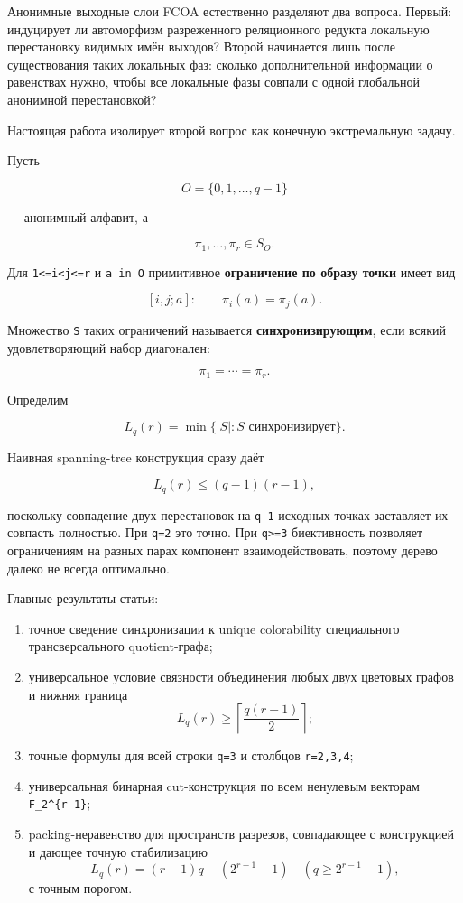 Анонимные выходные слои FCOA естественно разделяют два вопроса. Первый:
индуцирует ли автоморфизм разреженного реляционного редукта локальную
перестановку видимых имён выходов? Второй начинается лишь после
существования таких локальных фаз: сколько дополнительной информации о
равенствах нужно, чтобы все локальные фазы совпали с одной глобальной
анонимной перестановкой?

Настоящая работа изолирует второй вопрос как конечную экстремальную
задачу.

Пусть

\[
O=\{0,1,\ldots,q-1\}
\]

--- анонимный алфавит, а

\[
\pi_1,\ldots,\pi_r\in S_O.
\]

Для \texttt{1\textless{}=i\textless{}j\textless{}=r} и \texttt{a\ in\ O}
примитивное \textbf{ограничение по образу точки} имеет вид

\[
[i,j;a]:\qquad \pi_i(a)=\pi_j(a).
\tag{1}
\]

Множество \texttt{S} таких ограничений называется
\textbf{синхронизирующим}, если всякий удовлетворяющий набор диагонален:

\[
\pi_1=\cdots=\pi_r.
\tag{2}
\]

Определим

\[
\boxed{
L_q(r)=\min\{|S|:S\text{ синхронизирует}\}.
}
\tag{3}
\]

Наивная spanning-tree конструкция сразу даёт

\[
L_q(r)\le(q-1)(r-1),
\tag{4}
\]

поскольку совпадение двух перестановок на \texttt{q-1} исходных точках
заставляет их совпасть полностью. При \texttt{q=2} это точно. При
\texttt{q\textgreater{}=3} биективность позволяет ограничениям на разных
парах компонент взаимодействовать, поэтому дерево далеко не всегда
оптимально.

Главные результаты статьи:

\begin{enumerate}
\def\labelenumi{\arabic{enumi}.}
\tightlist
\item
  точное сведение синхронизации к unique colorability специального
  трансверсального quotient-графа;
\item
  универсальное условие связности объединения любых двух цветовых графов
  и нижняя граница \[
  L_q(r)\ge\left\lceil\frac{q(r-1)}2\right\rceil;
  \tag{5}
  \]
\item
  точные формулы для всей строки \texttt{q=3} и столбцов
  \texttt{r=2,3,4};
\item
  универсальная бинарная cut-конструкция по всем ненулевым векторам
  \texttt{F\_2\^{}\{r-1\}};
\item
  packing-неравенство для пространств разрезов, совпадающее с
  конструкцией и дающее точную стабилизацию \[
  L_q(r)=(r-1)q-(2^{r-1}-1)
  \quad(q\ge2^{r-1}-1),
  \tag{6}
  \] с точным порогом.
\end{enumerate}

